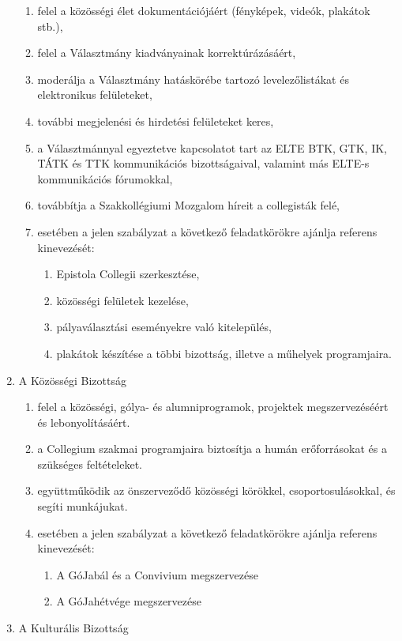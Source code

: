 \documentclass{../styles/rulebook}
\begin{document}
\begin{enumerate}
\begin{enumerate}
		\item felel a közösségi élet dokumentációjáért (fényképek, videók, plakátok stb.),
		\item felel a Választmány kiadványainak korrektúrázásáért,
		\item moderálja a Választmány hatáskörébe tartozó levelezőlistákat és elektronikus felületeket,
		\item további megjelenési és hirdetési felületeket keres,
		\item a Választmánnyal egyeztetve kapcsolatot tart az ELTE BTK, GTK, IK, TÁTK és TTK kommunikációs bizottságaival, valamint más ELTE-s kommunikációs fórumokkal,
		\item továbbítja a Szakkollégiumi Mozgalom híreit a collegisták felé,
		\item esetében a jelen szabályzat a következő feladatkörökre ajánlja referens kinevezését:
		\begin{enumerate}
			\item Epistola Collegii szerkesztése,
			\item közösségi felületek kezelése,
			\item pályaválasztási eseményekre való kitelepülés,
			\item plakátok készítése a többi bizottság, illetve a műhelyek programjaira.
		\end{enumerate}
	\end{enumerate}
	\item A Közösségi Bizottság
	\begin{enumerate}
		\item felel a közösségi, gólya- és alumniprogramok, projektek megszervezéséért és lebonyolításáért.
		\item a Collegium szakmai programjaira biztosítja a humán erőforrásokat és a szükséges feltételeket.
		\item együttműködik az önszerveződő közösségi körökkel, csoportosulásokkal, és segíti munkájukat.
		\item esetében a jelen szabályzat a következő feladatkörökre ajánlja referens kinevezését:
		\begin{enumerate}
			\item A GóJabál és a Convivium megszervezése
			\item A GóJahétvége megszervezése
		\end{enumerate}
	\end{enumerate}
	\item A Kulturális Bizottság
	\begin{enumerate}

\end{enumerate}
\end{enumerate}
\end{document}
